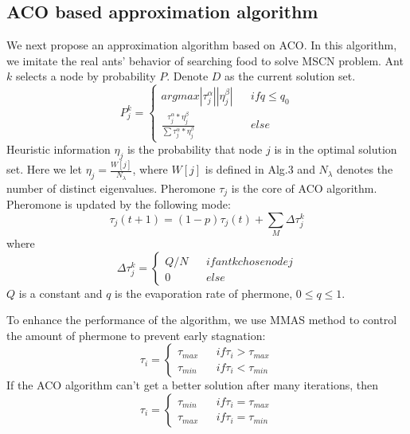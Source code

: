 \documentclass[10pt, conference, letterpaper]{IEEEtran}
\begin{document}
\subsection{ACO based approximation algorithm}
We next propose an approximation algorithm based on ACO. In this algorithm, we imitate the real ants' behavior of searching food to solve MSCN problem. Ant $k$ selects a node by probability $P$. Denote $D$ as the current solution set.
\begin{equation}
P_j^k=\left \{
\begin{array}{rcl}
argmax{|\tau_j^\alpha||\eta_j^\beta|} & & if q \le q_0 \\
\frac{\tau_j^\alpha * \eta_j^\beta}{\sum {\tau_j^\alpha * \eta_j^\beta}} & & else
\end{array}
\right.
\end{equation}
Heuristic information $\eta_j$ is the probability that node $j$ is in the optimal solution set. Here we let $\eta_j = \frac{W[j]}{N_\lambda}$, where $W[j]$ is defined in Alg.3 and $N_\lambda$ denotes the number of distinct eigenvalues. Pheromone $\tau_j$ is the core of ACO algorithm. Pheromone is updated by the following mode:
\begin{equation}
\tau_j(t+1)=(1-p)\tau_j(t)+\sum_M \Delta \tau_j^k
\end{equation}
where
\begin{equation}
\Delta \tau_j^k = \left \{
\begin{array}{rcl}
Q/N & &if ant k chose node j\\
0 & & else
\end{array}
\right.
\end{equation}
$Q$ is a constant and $q$ is the evaporation rate of phermone, $0\le q \le 1$.

To enhance the performance of the algorithm, we use MMAS method to control the amount of phermone to prevent early stagnation:
\begin{equation}
\tau_i = \left \{
\begin{array}{rcl}
\tau_{max} & &if \tau_i > \tau_{max}\\
\tau_{min} & & if \tau_i < \tau_{min}
\end{array}
\right.
\end{equation}
If the ACO algorithm can't get a better solution after many iterations, then
\begin{equation}
\tau_i = \left \{
\begin{array}{rcl}
\tau_{min} & &if \tau_i = \tau_{max}\\
\tau_{max} & & if \tau_i = \tau_{min}
\end{array}
\right.
\end{equation}
\end{document}
